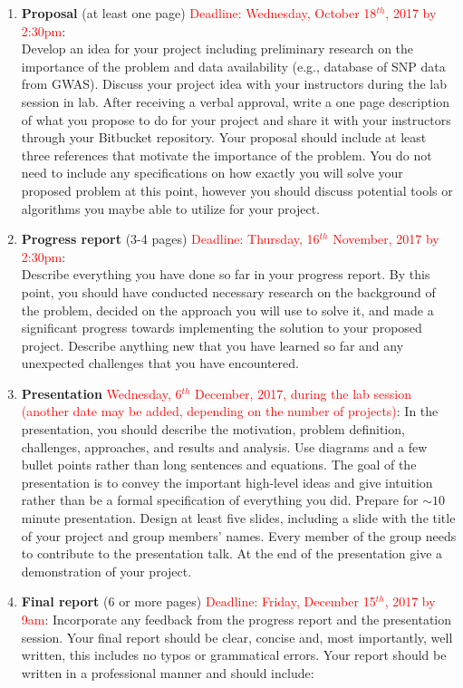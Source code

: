 \begin{enumerate}
\item \textbf{Proposal} (at least one page) \textcolor{red}{Deadline: Wednesday, October 18$^{th}$, 2017 by 2:30pm}: \\
Develop an idea for your project including preliminary research on the importance of the problem and data availability (e.g., database of SNP data from GWAS). Discuss your project idea with your instructors during the lab session in lab. After receiving a verbal approval, write a one page description of what you propose to do for your project and share it with your instructors through your Bitbucket repository. Your proposal should include at least three references that motivate the importance of the problem. You do not need to include any specifications on how exactly you will solve your proposed problem at this point, however you should discuss potential tools or algorithms you maybe able to utilize for your project. 

\item \textbf{Progress report} (3-4 pages) \textcolor{red}{Deadline: Thursday, 16$^{th}$ November, 2017 by 2:30pm}: \\
Describe everything you have done so far in your progress report. By this point, you should have conducted necessary research on the background of the problem, decided on the approach you will use to solve it, and made a significant progress towards implementing the solution to your proposed project. Describe anything new that you have learned so far and any unexpected challenges that you have encountered.

\item \textbf{Presentation} \textcolor{red}{Wednesday, 6$^{th}$ December, 2017, during the lab session (another date may be added, depending on the number of projects)}: In the presentation, you should describe the motivation, problem definition, challenges, approaches, and results and analysis. Use diagrams and a few bullet points rather than long sentences and equations. The goal of the presentation is to convey the important high-level ideas and give intuition rather than be a formal specification of everything you did. Prepare for $\sim 10$ minute presentation. Design at least five slides, including a slide with the title of your project and group members' names. Every member of the group needs to contribute to the presentation talk. At the end of the presentation give a demonstration of your project.
 
\item \textbf{Final report} (6 or more pages) \textcolor{red}{Deadline: Friday, December 15$^{th}$, 2017 by 9am}: Incorporate any feedback from the progress report and the presentation session. Your final report should be clear, concise and, most importantly, well written, this includes no typos or grammatical errors. Your report should be written in a professional manner and should include:


\end{enumerate}
